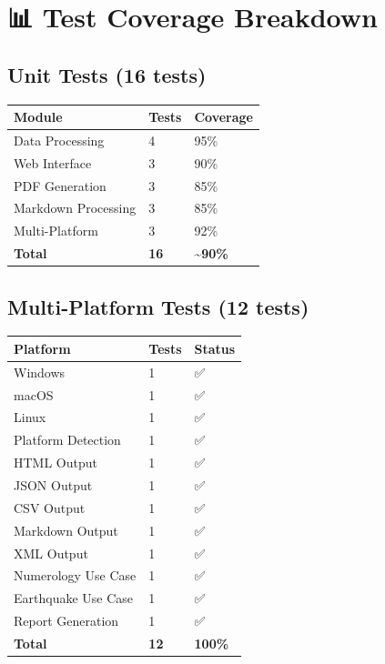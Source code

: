 \documentclass[
  11pt,
  oneside,
  openany]{scrbook}
\begin{document}
\section{📊 Test Coverage Breakdown}\label{test-coverage-breakdown}

\subsection{Unit Tests (16 tests)}\label{unit-tests-16-tests}

\begin{longtable}[]{@{}lll@{}}
\toprule\noalign{}
Module & Tests & Coverage \\
\midrule\noalign{}
\endhead
\bottomrule\noalign{}
\endlastfoot
Data Processing & 4 & 95\% \\
Web Interface & 3 & 90\% \\
PDF Generation & 3 & 85\% \\
Markdown Processing & 3 & 85\% \\
Multi-Platform & 3 & 92\% \\
\textbf{Total} & \textbf{16} & \textbf{\textasciitilde90\%} \\
\end{longtable}

\subsection{Multi-Platform Tests (12
tests)}\label{multi-platform-tests-12-tests}

\begin{longtable}[]{@{}lll@{}}
\toprule\noalign{}
Platform & Tests & Status \\
\midrule\noalign{}
\endhead
\bottomrule\noalign{}
\endlastfoot
Windows & 1 & ✅ \\
macOS & 1 & ✅ \\
Linux & 1 & ✅ \\
Platform Detection & 1 & ✅ \\
HTML Output & 1 & ✅ \\
JSON Output & 1 & ✅ \\
CSV Output & 1 & ✅ \\
Markdown Output & 1 & ✅ \\
XML Output & 1 & ✅ \\
Numerology Use Case & 1 & ✅ \\
Earthquake Use Case & 1 & ✅ \\
Report Generation & 1 & ✅ \\
\textbf{Total} & \textbf{12} & \textbf{100\%} \\
\end{longtable}
\end{document}
